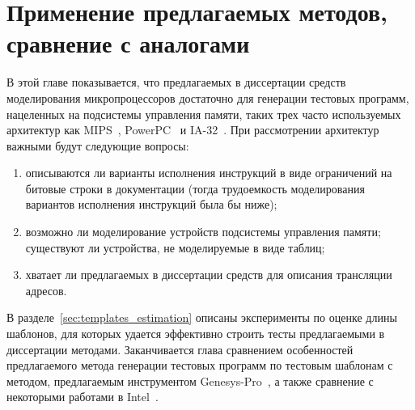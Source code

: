 \chapter{Применение предлагаемых методов, сравнение с аналогами}

В этой главе показывается, что предлагаемых в диссертации средств моделирования микропроцессоров достаточно для генерации тестовых программ, нацеленных на подсистемы управления памяти, таких трех часто используемых архитектур как MIPS~\cite{mips64II}, PowerPC~\cite{PowerPC} и IA-32~\cite{IA32}. При рассмотрении архитектур важными будут следующие вопросы:
\begin{enumerate}
    \item описываются ли варианты исполнения инструкций в виде ограничений на битовые строки в документации (тогда трудоемкость моделирования вариантов исполнения инструкций была бы ниже);
    \item возможно ли моделирование устройств подсистемы управления памяти; существуют ли устройства, не моделируемые в виде таблиц;
    \item хватает ли предлагаемых в диссертации средств для описания трансляции адресов.
\end{enumerate}

В разделе~\ref{sec:templates_estimation} описаны эксперименты по оценке длины шаблонов, для
которых удается эффективно строить тесты предлагаемыми в диссертации
методами. Заканчивается глава
сравнением особенностей предлагаемого метода генерации тестовых программ по
тестовым шаблонам с методом, предлагаемым инструментом
Genesys-Pro~\cite{GenesysPro}, а также сравнение с некоторыми работами в Intel~\cite{MicroFORMAL}.




